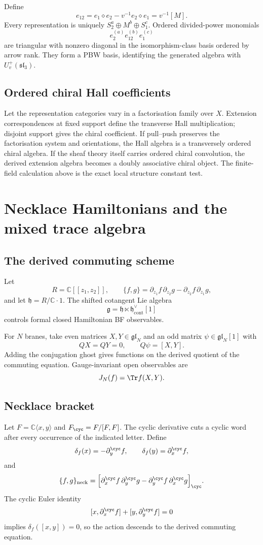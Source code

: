 Define
\[
 e_{12}=e_1\diamond e_2-v^{-1}e_2\diamond e_1=v^{-1}[M].
\]
Every representation is uniquely \(S_2^a\oplus M^b\oplus S_1^c\).  Ordered divided-power monomials
\[
 e_2^{(a)}e_{12}^{(b)}e_1^{(c)}
\]
are triangular with nonzero diagonal in the isomorphism-class basis ordered by arrow rank.  They form a PBW basis, identifying the generated algebra with \(U_v^+(\mathfrak{sl}_3)\).

\section{Ordered chiral Hall coefficients}
Let the representation categories vary in a factorisation family over \(X\).  Extension correspondences at fixed support define the transverse Hall multiplication; disjoint support gives the chiral coefficient.  If pull--push preserves the factorisation system and orientations, the Hall algebra is a transversely ordered chiral algebra.  If the sheaf theory itself carries ordered chiral convolution, the derived extension algebra becomes a doubly associative chiral object.  The finite-field calculation above is the exact local structure constant test.

\chapter{Necklace Hamiltonians and the mixed trace algebra}\label{chap:trace}

\section{The derived commuting scheme}
Let
\[
 R=\mathbb C[[z_1,z_2]],
 \qquad
 \{f,g\}=\partial_{z_1}f\,\partial_{z_2}g-
 \partial_{z_2}f\,\partial_{z_1}g,
\]
and let \(\mathfrak h=R/\mathbb C\cdot1\).  The shifted cotangent Lie algebra
\[
 \mathfrak g=\mathfrak h\ltimes\mathfrak h^\vee_{\mathrm{cont}}[1]
\]
controls formal closed Hamiltonian BF observables.

For \(N\) branes, take even matrices \(X,Y\in\mathfrak{gl}_N\) and an odd matrix \(\psi\in\mathfrak{gl}_N[1]\) with
\[
 QX=QY=0,
 \qquad Q\psi=[X,Y].
\]
Adding the conjugation ghost gives functions on the derived quotient of the commuting equation.  Gauge-invariant open observables are
\[
 J_N(f)=\Tr f(X,Y).
\]

\section{Necklace bracket}
Let \(F=\mathbb C\langle x,y\rangle\) and \(F_{\cyc}=F/[F,F]\).  The cyclic derivative cuts a cyclic word after every occurrence of the indicated letter.  Define
\[
 \delta_f(x)=-\partial_y^{\cyc}f,
 \qquad
 \delta_f(y)=\partial_x^{\cyc}f,
\]
and
\[
 \{f,g\}_{\mathrm{neck}}
 =\Bigl[
 \partial_x^{\cyc}f\,\partial_y^{\cyc}g-
 \partial_y^{\cyc}f\,\partial_x^{\cyc}g
 \Bigr]_{\cyc}.
\]
The cyclic Euler identity
\[
 [x,\partial_x^{\cyc}f]+[y,\partial_y^{\cyc}f]=0
\]
implies \(\delta_f([x,y])=0\), so the action descends to the derived commuting equation.

